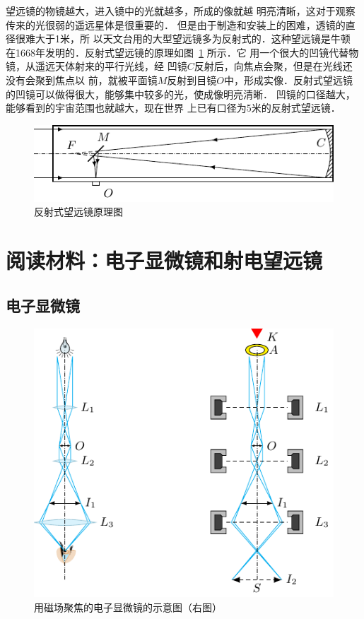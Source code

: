 望远镜的物镜越大，进入镜中的光就越多，所成的像就越
明亮清晰，这对于观察传来的光很弱的遥远星体是很重要的．
但是由于制造和安装上的困难，透镜的直径很难大于1米，所
以天文台用的大型望远镜多为反射式的．这种望远镜是牛顿
在1668年发明的．反射式望远镜的原理如图~\ref{fig_C_5-55} 所示．它
用一个很大的凹镜代替物镜，从遥远天体射来的平行光线，经
凹镜$C$反射后，向焦点会聚，但是在光线还没有会聚到焦点以
前，就被平面镜$M$反射到目镜$O$中，形成实像．反射式望远镜
的凹镜可以做得很大，能够集中较多的光，使成像明亮清晰．
凹镜的口径越大，能够看到的宇宙范围也就越大，现在世界
上已有口径为5米的反射式望远镜．
\begin{figure}[htbp]
    \centering
    \includegraphics{fig/C/5-55.pdf}
    \caption{反射式望远镜原理图}\label{fig_C_5-55}
\end{figure}

\section*{阅读材料：电子显微镜和射电望远镜}
\subsection*{电子显微镜}

\begin{figure}[htbp]
    \centering
    \includegraphics{fig/C/5-56.pdf}
    \caption{用磁场聚焦的电子显微镜的示意图（右图）}\label{fig_C_5-56}
\end{figure}

